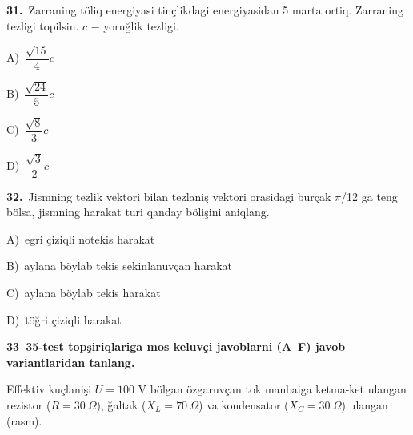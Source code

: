 \documentclass[11pt,a4paper]{article}
\newcommand{\opt}[2]{\hspace*{4mm}#1)\ #2\par}
\begin{document}
\noindent\begin{minipage}{\linewidth}
\textbf{31.}\ Zarraning töliq energiyasi tinçlikdagi energiyasidan 5 marta ortiq. Zarraning tezligi topilsin. $c$ $-$ yoruğlik tezligi.\par\smallskip
\opt{A}{$\dfrac{\sqrt{15}}{4}c$}
\opt{B}{$\dfrac{\sqrt{24}}{5}c$}
\opt{C}{$\dfrac{\sqrt{8}}{3}c$}
\opt{D}{$\dfrac{\sqrt{3}}{2}c$}
\end{minipage}\vspace{9pt}\par
\noindent\begin{minipage}{\linewidth}
\textbf{32.}\ Jismning tezlik vektori bilan tezlaniş vektori orasidagi burçak $\pi$/12 ga teng bölsa, jismning harakat turi qanday bölişini aniqlang.\par\smallskip
\opt{A}{egri çiziqli notekis harakat}
\opt{B}{aylana böylab tekis sekinlanuvçan harakat}
\opt{C}{aylana böylab tekis harakat}
\opt{D}{töğri çiziqli harakat}
\end{minipage}\vspace{9pt}\par
\newpage\noindent\textbf{33–35-test topşiriqlariga mos keluvçi javoblarni (A–F) javob variantlaridan tanlang.}\par\smallskip
Effektiv kuçlanişi $U=100$ V bölgan özgaruvçan tok manbaiga ketma-ket ulangan rezistor ($R=30\ \Omega$), ğaltak ($X_L=70\ \Omega$) va kondensator ($X_C=30\ \Omega$) ulangan (rasm).\par\medskip
\begin{center}\end{center}
\end{document}
